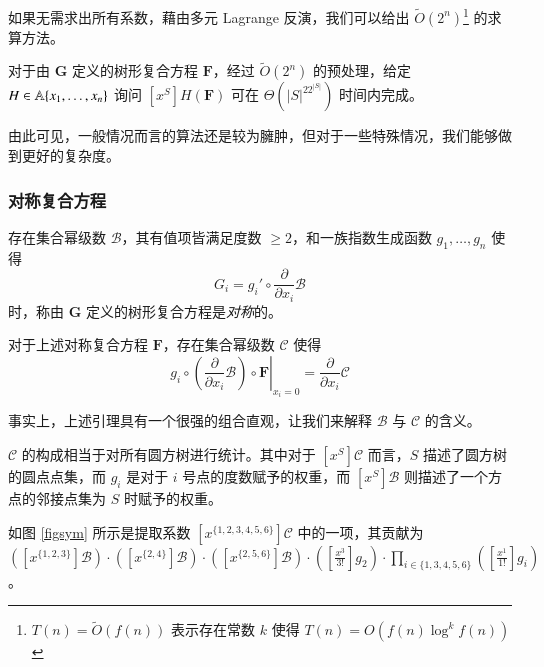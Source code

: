 如果无需求出所有系数，藉由多元 Lagrange 反演，我们可以给出 $\tilde O(2^n)$\footnote{$T(n) = \tilde O(f(n))$ 表示存在常数 $k$ 使得 $T(n) = O(f(n)\log ^k f(n))$} 的求算方法。

\begin{theorem} \label{algocomp}
对于由 $\mathbf G$ 定义的树形复合方程 $\mathbf F$，经过 $\tilde O(2^n)$ 的预处理，给定 $H \in \mathbb A\{x_1,\dots,x_n\}$ 询问 $[x^S] H(\mathbf F)$ 可在 $\Theta(|S|^22^{|S|})$ 时间内完成。
\end{theorem}

由此可见，一般情况而言的算法还是较为臃肿，但对于一些特殊情况，我们能够做到更好的复杂度。

\subsubsection{对称复合方程}

\begin{definition}[对称复合方程]
存在集合幂级数 $\mathscr B$，其有值项皆满足度数 $\ge 2$，和一族指数生成函数 $g_1,\dots,g_n$ 使得
$$
G_i=g_i'\circ \frac{\partial}{\partial x_i} \mathscr B
$$
时，称由 $\mathbf G$ 定义的树形复合方程是\emph{对称}的。
\end{definition}

\begin{lemma}
对于上述对称复合方程 $\mathbf F$，存在集合幂级数 $\mathscr C$ 使得
$$
\left. g_i \circ \left(\frac{\partial}{\partial x_i}\mathscr B\right)\circ \mathbf F \right|_{x_i=0} = \frac{\partial}{\partial x_i} \mathscr C
$$
\end{lemma}

事实上，上述引理具有一个很强的组合直观，让我们来解释 $\mathscr B$ 与 $\mathscr C$ 的含义。

$\mathscr C$ 的构成相当于对所有圆方树进行统计。其中对于 $[x^S]\mathscr C$ 而言，$S$ 描述了圆方树的圆点点集，而 $g_i$ 是对于 $i$ 号点的度数赋予的权重，而 $[x^S]\mathscr B$ 则描述了一个方点的邻接点集为 $S$ 时赋予的权重。

如图 \ref{figsym} 所示是提取系数 $[x^{\{1,2,3,4,5,6\}}]\mathscr C$ 中的一项，其贡献为 $([x^{\{1,2,3\}}]\mathscr B)\cdot([x^{\{2,4\}}]\mathscr B)\cdot([x^{\{2,5,6\}}]\mathscr B)\cdot([\frac{x^3}{3!}]g_2)\cdot \prod_{i\in \{1,3,4,5,6\}}([\frac{x^1}{1!}]g_i)$。

